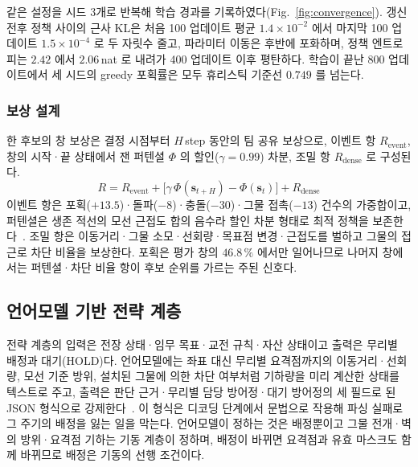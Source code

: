 같은 설정을 시드 3개로 반복해 학습 경과를 기록하였다(Fig.~\ref{fig:convergence}). 갱신 전후
정책 사이의 근사 KL은 처음 100 업데이트 평균 $1.4\times10^{-2}$ 에서 마지막 100 업데이트
$1.5\times10^{-4}$ 로 두 자릿수 줄고, 파라미터 이동은 후반에 포화하며, 정책 엔트로피는
$2.42$ 에서 $2.06$\,nat 로 내려가 400 업데이트 이후 평탄하다. 학습이 끝난 800 업데이트에서
세 시드의 greedy 포획률은 모두 휴리스틱 기준선 $0.749$ 를 넘는다.

\subsubsection{보상 설계}
\label{sec:reward}

한 후보의 창 보상은 결정 시점부터 $H$\,step 동안의 팀 공유 보상으로, 이벤트 항 $R_\mathrm{event}$,
창의 시작·끝 상태에서 잰 퍼텐셜 $\Phi$ 의 할인($\gamma = 0.99$) 차분, 조밀 항 $R_\mathrm{dense}$ 로
구성된다.
\begin{equation}
R = R_\mathrm{event} + \big[\gamma\,\Phi(\mathbf{s}_{t+H}) - \Phi(\mathbf{s}_t)\big] + R_\mathrm{dense}
\label{eq:reward}
\end{equation}
이벤트 항은 포획($+13.5$)·돌파($-8$)·충돌($-30$)·그물 접촉($-13$) 건수의 가중합이고, 퍼텐셜은
생존 적선의 모선 근접도 합의 음수라 할인 차분 형태로 최적 정책을 보존한다~\citep{ng1999shaping}.
조밀 항은 이동거리·그물 소모·선회량·목표점 변경·근접도를 벌하고 그물의 접근로 차단 비율을
보상한다. 포획은 평가 창의 $46.8\,\%$ 에서만 일어나므로 나머지 창에서는 퍼텐셜·차단 비율 항이
후보 순위를 가르는 주된 신호다.

\subsection{언어모델 기반 전략 계층}
\label{sec:commander}
\label{sec:schema}

전략 계층의 입력은 전장 상태·임무 목표·교전 규칙·자산 상태이고 출력은 무리별 배정과 대기(HOLD)다.
언어모델에는 좌표 대신 무리별 요격점까지의 이동거리·선회량, 모선 기준 방위, 설치된 그물에 의한
차단 여부처럼 기하량을 미리 계산한 상태를 텍스트로 주고, 출력은 판단 근거·무리별 담당 방어정·대기
방어정의 세 필드로 된 JSON 형식으로 강제한다~\citep{openai2026function}. 이 형식은 디코딩 단계에서
문법으로 작용해 파싱 실패로 그 주기의 배정을 잃는 일을 막는다. 언어모델이 정하는 것은 배정뿐이고
그물 전개·벽의 방위·요격점 기하는 기동 계층이 정하며, 배정이 바뀌면 요격점과 유효 마스크도 함께
바뀌므로 배정은 기동의 선행 조건이다.
